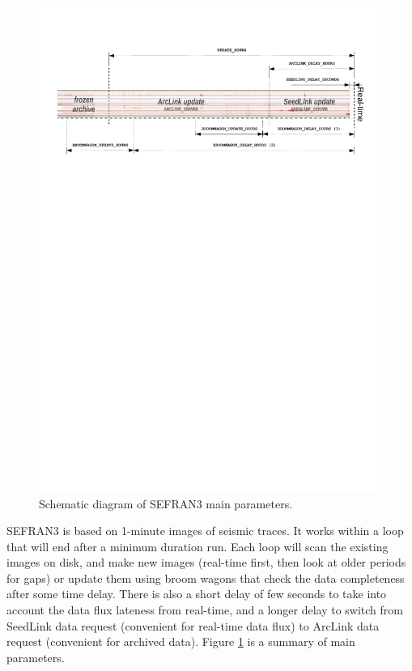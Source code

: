 \begin{figure}
\includegraphics[width=\textwidth]{figures/sefran3_diagram.pdf}
\caption{Schematic diagram of SEFRAN3 main parameters.}
\label{sefran3_diagram}
\end{figure}

SEFRAN3 is based on 1-minute images of seismic traces. It works within a loop that will end after a minimum duration run. Each loop will scan the existing images on disk, and make new images (real-time first, then look at older periods for gaps) or update them using broom wagons that check the data completeness after some time delay. There is also a short delay of few seconds to take into account the data flux lateness from real-time, and a longer delay to switch from SeedLink data request (convenient for real-time data flux) to ArcLink data request (convenient for archived data). Figure \ref{sefran3_diagram} is a summary of main parameters.


